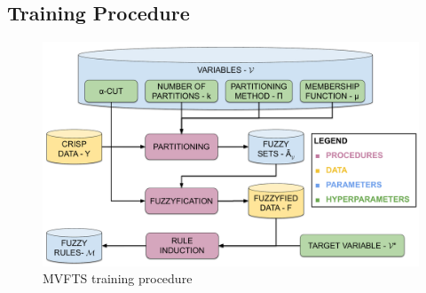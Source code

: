 \subsection{Training Procedure}
\label{sec:mvfts_training_procedure}

\begin{figure}
\centering
\includegraphics[width=\textwidth]{figures/mvfts_training_procedure.pdf}
\caption{MVFTS training procedure} \label{fig:mvfts_training_procedure}
\end{figure}

